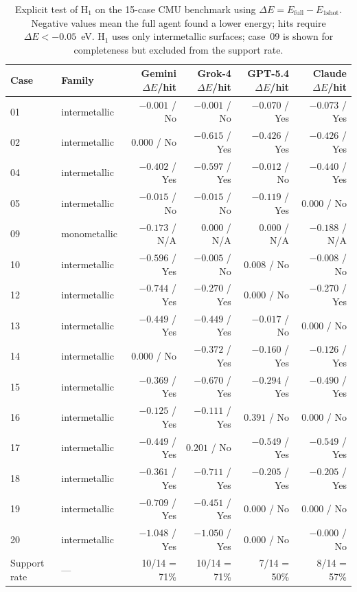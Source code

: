 \begin{table}[t]
\centering
\small
\caption{Explicit test of H$_1$ on the 15-case CMU benchmark using $\Delta E = E_{\mathrm{full}} - E_{\mathrm{1shot}}$. Negative values mean the full agent found a lower energy; hits require $\Delta E < -0.05$~eV. H$_1$ uses only intermetallic surfaces; case~09 is shown for completeness but excluded from the support rate.}
\label{tab:hypothesis-test}
\begin{tabular}{llrrrr}
\toprule
Case & Family & Gemini $\Delta E$/hit & Grok-4 $\Delta E$/hit & GPT-5.4 $\Delta E$/hit & Claude $\Delta E$/hit \\
\midrule
01 & intermetallic & $-0.001$ / No & $-0.001$ / No & $-0.070$ / Yes & $-0.073$ / Yes \\
02 & intermetallic & $0.000$ / No & $-0.615$ / Yes & $-0.426$ / Yes & $-0.426$ / Yes \\
04 & intermetallic & $-0.402$ / Yes & $-0.597$ / Yes & $-0.012$ / No & $-0.440$ / Yes \\
05 & intermetallic & $-0.015$ / No & $-0.015$ / No & $-0.119$ / Yes & $0.000$ / No \\
09 & monometallic & $-0.173$ / N/A & $0.000$ / N/A & $0.000$ / N/A & $-0.188$ / N/A \\
10 & intermetallic & $-0.596$ / Yes & $-0.005$ / No & $0.008$ / No & $-0.008$ / No \\
12 & intermetallic & $-0.744$ / Yes & $-0.270$ / Yes & $0.000$ / No & $-0.270$ / Yes \\
13 & intermetallic & $-0.449$ / Yes & $-0.449$ / Yes & $-0.017$ / No & $0.000$ / No \\
14 & intermetallic & $0.000$ / No & $-0.372$ / Yes & $-0.160$ / Yes & $-0.126$ / Yes \\
15 & intermetallic & $-0.369$ / Yes & $-0.670$ / Yes & $-0.294$ / Yes & $-0.490$ / Yes \\
16 & intermetallic & $-0.125$ / Yes & $-0.111$ / Yes & $0.391$ / No & $0.000$ / No \\
17 & intermetallic & $-0.449$ / Yes & $0.201$ / No & $-0.549$ / Yes & $-0.549$ / Yes \\
18 & intermetallic & $-0.361$ / Yes & $-0.711$ / Yes & $-0.205$ / Yes & $-0.205$ / Yes \\
19 & intermetallic & $-0.709$ / Yes & $-0.451$ / Yes & $0.000$ / No & $0.000$ / No \\
20 & intermetallic & $-1.048$ / Yes & $-1.050$ / Yes & $0.000$ / No & $-0.000$ / No \\
\midrule
Support rate & --- & 10/14 = 71\% & 10/14 = 71\% & 7/14 = 50\% & 8/14 = 57\% \\
\bottomrule
\end{tabular}
\end{table}
